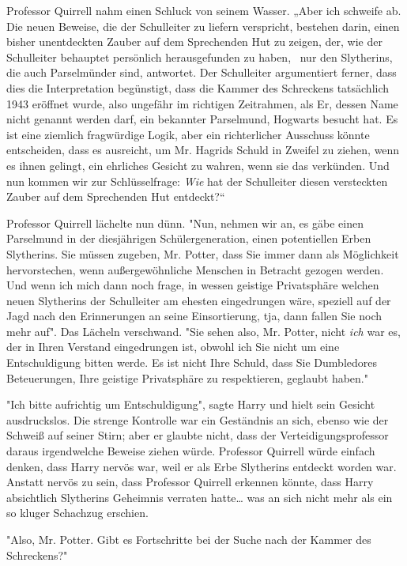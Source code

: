 {Professor Quirrell nahm einen Schluck von seinem Wasser. „Aber ich schweife ab. Die neuen Beweise, die der Schulleiter zu liefern verspricht, bestehen darin, einen bisher unentdeckten Zauber auf dem Sprechenden Hut zu zeigen, der, wie der Schulleiter behauptet persönlich herausgefunden zu haben, ~nur den Slytherins, die auch Parselmünder sind, antwortet. Der Schulleiter argumentiert ferner, dass dies die Interpretation begünstigt, dass die Kammer des Schreckens tatsächlich 1943 eröffnet wurde, also ungefähr im richtigen Zeitrahmen, als Er, dessen Name nicht genannt werden darf, ein bekannter Parselmund, Hogwarts besucht hat. Es ist eine ziemlich fragwürdige Logik, aber ein richterlicher Ausschuss könnte entscheiden, dass es ausreicht, um Mr. Hagrids Schuld in Zweifel zu ziehen, wenn es ihnen gelingt, ein ehrliches Gesicht zu wahren, wenn sie das verkünden. Und nun kommen wir zur Schlüsselfrage: \emph{Wie} hat der Schulleiter diesen versteckten Zauber auf dem Sprechenden Hut entdeckt?“

Professor Quirrell lächelte nun dünn. "Nun, nehmen wir an, es gäbe einen Parselmund in der diesjährigen Schülergeneration, einen potentiellen Erben Slytherins. Sie müssen zugeben, Mr. Potter, dass Sie immer dann als Möglichkeit hervorstechen, wenn außergewöhnliche Menschen in Betracht gezogen werden. Und wenn ich mich dann noch frage, in wessen geistige Privatsphäre welchen neuen Slytherins der Schulleiter am ehesten eingedrungen wäre, speziell auf der Jagd nach den Erinnerungen an seine Einsortierung, tja, dann fallen Sie noch mehr auf". Das Lächeln verschwand. "Sie sehen also, Mr. Potter, nicht \emph{ich} war es, der in Ihren Verstand eingedrungen ist, obwohl ich Sie nicht um eine Entschuldigung bitten werde. Es ist nicht Ihre Schuld, dass Sie Dumbledores Beteuerungen, Ihre geistige Privatsphäre zu respektieren, geglaubt haben."

"Ich bitte aufrichtig um Entschuldigung", sagte Harry und hielt sein Gesicht ausdruckslos. Die strenge Kontrolle war ein Geständnis an sich, ebenso wie der Schweiß auf seiner Stirn; aber er glaubte nicht, dass der Verteidigungsprofessor daraus irgendwelche Beweise ziehen würde. Professor Quirrell würde einfach denken, dass Harry nervös war, weil er als Erbe Slytherins entdeckt worden war. Anstatt nervös zu sein, dass Professor Quirrell erkennen könnte, dass Harry absichtlich Slytherins Geheimnis verraten hatte… was an sich nicht mehr als ein so kluger Schachzug erschien.

"Also, Mr. Potter. Gibt es Fortschritte bei der Suche nach der Kammer des Schreckens?"

}
